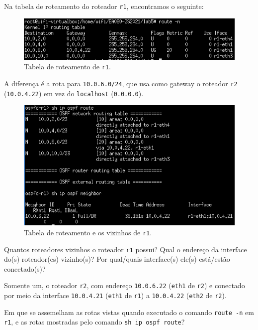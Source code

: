 \documentclass{article}
\begin{document}
Na tabela de roteamento do roteador \texttt{r1}, encontramos o seguinte:

\begin{figure}[!htb]
\centering
\includegraphics[width=\columnwidth]{images/p2_routes.png}
\caption{Tabela de roteamento de \texttt{r1}.}
\end{figure}

A diferença é a rota para \texttt{10.0.6.0/24}, que usa como
gateway o roteador \texttt{r2} (\texttt{10.0.4.22}) em vez
do \texttt{localhost} (\texttt{0.0.0.0}).

\FloatBarrier
\begin{figure}[!htb]
\centering
\includegraphics[width=\columnwidth]{images/p2_ospf.png}
\caption{Tabela de roteamento e os vizinhos de \texttt{r1}.}
\end{figure}
\FloatBarrier

\begin{tcolorbox}
    Quantos roteadores vizinhos o roteador \texttt{r1} possui?
    Qual o endereço da interface do(s) roteador(es) vizinho(s)?
    Por qual/quais interface(s) ele(s) está/estão conectado(s)?
\end{tcolorbox}

Somente um, o roteador \texttt{r2}, com endereço \texttt{10.0.6.22}
(\texttt{eth1} de \texttt{r2}) e conectado por meio da interface \texttt{10.0.4.21} (\texttt{eth1} de \texttt{r1}) a \texttt{10.0.4.22} (\texttt{eth2} de \texttt{r2}).

\begin{tcolorbox}
    Em que se assemelham as rotas vistas quando executado
    o comando \texttt{route -n} em \texttt{r1}, e as rotas
    mostradas pelo comando \texttt{sh ip ospf route}?
\end{tcolorbox}
\end{document}
